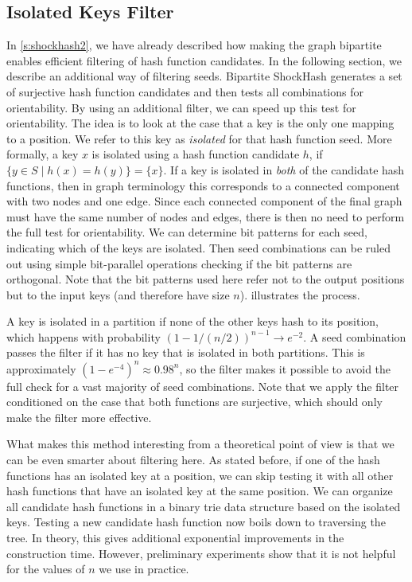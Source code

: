 \documentclass[a4paper,USenglish,cleveref]{lipics-v2021}
\begin{document}
\subsection{Isolated Keys Filter}\label{s:isolatedKeys}
In \cref{s:shockhash2}, we have already described how making the graph bipartite enables efficient filtering of hash function candidates.
In the following section, we describe an additional way of filtering seeds.
Bipartite ShockHash generates a set of surjective hash function candidates and then tests all combinations for orientability.
By using an additional filter, we can speed up this test for orientability.
The idea is to look at the case that a key is the only one mapping to a position.
We refer to this key as \emph{isolated} for that hash function seed.
More formally, a key $x$ is isolated using a hash function candidate $h$, if $\{y\in S \mid h(x) = h(y)\} = \{x\}$.
If a key is isolated in \emph{both} of the candidate hash functions, then in graph terminology this corresponds to a connected component with two nodes and one edge.
Since each connected component of the final graph must have the same number of nodes and edges, there is then no need to perform the full test for orientability.
We can determine bit patterns for each seed, indicating which of the keys are isolated.
Then seed combinations can be ruled out using simple bit-parallel operations checking if the bit patterns are orthogonal.
Note that the bit patterns used here refer not to the output positions but to the input keys (and therefore have size $n$).
 illustrates the process.

A key is isolated in a partition if none of the other keys hash to its position, which happens with probability $(1-1/(n/2))^{n-1} \rightarrow e^{-2}$.
A seed combination passes the filter if it has no key that is isolated in both partitions.
This is approximately $(1-e^{-4})^{n} \approx 0.98^n$, so the filter makes it possible to avoid the full check for a vast majority of seed combinations.
Note that we apply the filter conditioned on the case that both functions are surjective, which should only make the filter more effective.

What makes this method interesting from a theoretical point of view is that we can be even smarter about filtering here.
As stated before, if one of the hash functions has an isolated key at a position, we can skip testing it with all other hash functions that have an isolated key at the same position.
We can organize all candidate hash functions in a binary trie data structure based on the isolated keys.
Testing a new candidate hash function now boils down to traversing the tree.
In theory, this gives additional exponential improvements in the construction time.
However, preliminary experiments show that it is not helpful for the values of $n$ we use in practice.
\end{document}
